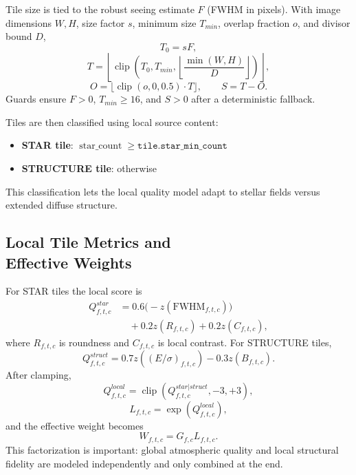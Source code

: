 \documentclass[10pt,twocolumn]{article}
\begin{document}
Tile size is tied to the robust seeing estimate $F$ (FWHM in pixels). With image dimensions $W,H$, size factor $s$, minimum size $T_{min}$, overlap fraction $o$, and divisor bound $D$,
\begin{equation}
  T_0 = sF,
\end{equation}
\begin{equation}
  T = \left\lfloor \operatorname{clip}\!\left(T_0, T_{min}, \left\lfloor \frac{\min(W,H)}{D} \right\rfloor \right) \right\rfloor,
\end{equation}
\begin{equation}
  O = \lfloor \operatorname{clip}(o,0,0.5) \cdot T \rfloor,
  \qquad
  S = T - O.
\end{equation}
Guards ensure $F>0$, $T_{min}\ge 16$, and $S>0$ after a deterministic fallback.

Tiles are then classified using local source content:
\begin{itemize}
  \item \textbf{STAR tile}: $\operatorname{star\_count} \ge \texttt{tile.star\_min\_count}$
  \item \textbf{STRUCTURE tile}: otherwise
\end{itemize}
This classification lets the local quality model adapt to stellar fields versus extended diffuse structure.

\subsection{Local Tile Metrics and \protect \\Effective Weights}

For STAR tiles the local score is
\begin{equation}
\begin{aligned}
  Q_{f,t,c}^{star}
  &=
  0.6\bigl(-z(\mathrm{FWHM}_{f,t,c})\bigr) \\
  &\quad + 0.2z(R_{f,t,c})
  + 0.2z(C_{f,t,c}),
\end{aligned}
\end{equation}
where $R_{f,t,c}$ is roundness and $C_{f,t,c}$ is local contrast. For STRUCTURE tiles,
\begin{equation}
  Q_{f,t,c}^{struct}
  =
  0.7z((E/\sigma)_{f,t,c})
  - 0.3z(B_{f,t,c}).
\end{equation}
After clamping,
\begin{equation}
  Q_{f,t,c}^{local} = \operatorname{clip}(Q_{f,t,c}^{star|struct}, -3, +3),
\end{equation}
\begin{equation}
  L_{f,t,c} = \exp(Q_{f,t,c}^{local}),
\end{equation}
and the effective weight becomes
\begin{equation}
  W_{f,t,c} = G_{f,c}L_{f,t,c}.
\end{equation}
This factorization is important: global atmospheric quality and local structural fidelity are modeled independently and only combined at the end.
\end{document}

